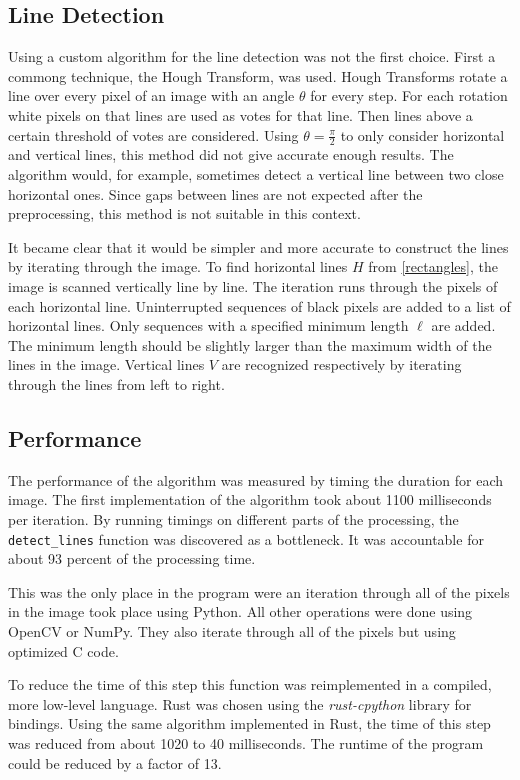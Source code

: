 \documentclass[serif,article,noparskip]{agse-thesis}
\begin{document}
\subsection{Line Detection} \label{linedetection}

Using a custom algorithm for the line detection was not the first choice. First
a commong technique, the Hough Transform, was used. Hough Transforms rotate a
line over every pixel of an image with an angle $\theta$ for every step. For
each rotation white pixels on that lines are used as votes for that line. Then
lines above a certain threshold of votes are considered. Using $\theta =
\frac{\pi}{2}$ to only consider horizontal and vertical lines, this method did
not give accurate enough results. The algorithm would, for example, sometimes
detect a vertical line between two close horizontal ones. Since gaps between
lines are not expected after the preprocessing, this method is not suitable
in this context.

It became clear that it would be simpler and more accurate to construct the
lines by iterating through the image. To find horizontal lines $H$ from
\ref{rectangles}, the image is scanned vertically line by line. The
iteration runs through the pixels of each horizontal line. Uninterrupted
sequences of black pixels are added to a list of horizontal lines. Only
sequences with a specified minimum length $\ell$ are added. The minimum length
should be slightly larger than the maximum width of the lines in the image.
Vertical lines $V$ are recognized respectively by iterating through the lines
from left to right.

\subsection{Performance} \label{performance}

The performance of the algorithm was measured by timing the duration for each
image. The first implementation of the algorithm took about 1100 milliseconds per
iteration. By running timings on different parts of the processing, the
\texttt{detect\_lines} function was discovered as a bottleneck. It was
accountable for about 93 percent of the processing time.

This was the only place in the program were an iteration through all of the
pixels in the image took place using Python. All other operations were done
using OpenCV or NumPy. They also iterate through all of the pixels but using
optimized C code.

To reduce the time of this step this function was reimplemented in a compiled,
more low-level language. Rust was chosen using the \textit{rust-cpython} library
for bindings. Using the same algorithm implemented in Rust, the time of this
step was reduced from about 1020 to 40 milliseconds. The runtime of the program
could be reduced by a factor of 13.
\end{document}
